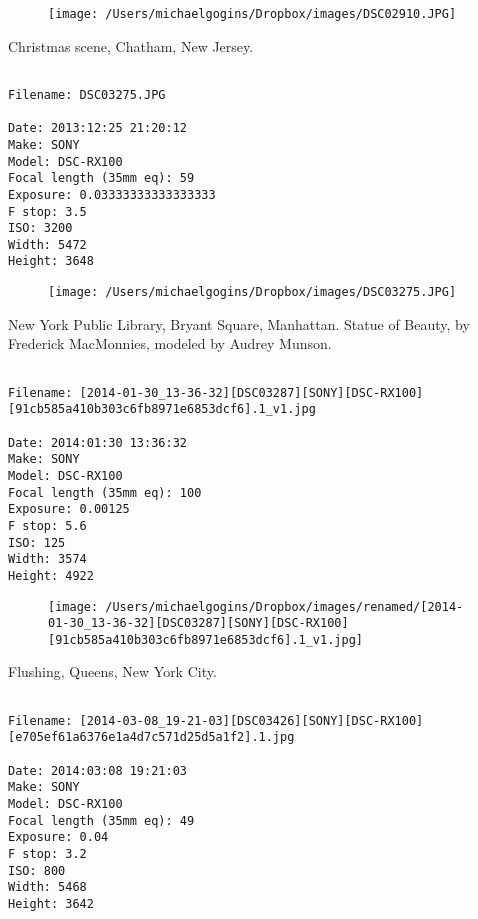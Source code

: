 \documentclass[11pt,letter,DIV=14,paper=landscape]{scrbook}
\begin{document}
\begin{figure}
\texttt{[image: /Users/michaelgogins/Dropbox/images/DSC02910.JPG]}
\end{figure}
    
\clearpage
\noindent Christmas scene, Chatham, New Jersey.
\noindent
\begin{lstlisting}

Filename: DSC03275.JPG

Date: 2013:12:25 21:20:12
Make: SONY
Model: DSC-RX100
Focal length (35mm eq): 59
Exposure: 0.03333333333333333
F stop: 3.5
ISO: 3200
Width: 5472
Height: 3648
\end{lstlisting}
\clearpage

\begin{figure}
\texttt{[image: /Users/michaelgogins/Dropbox/images/DSC03275.JPG]}
\end{figure}
    
\clearpage
\noindent New York Public Library, Bryant Square, Manhattan. Statue of Beauty, by Frederick MacMonnies, modeled by Audrey Munson.
\noindent
\begin{lstlisting}

Filename: [2014-01-30_13-36-32][DSC03287][SONY][DSC-RX100][91cb585a410b303c6fb8971e6853dcf6].1_v1.jpg

Date: 2014:01:30 13:36:32
Make: SONY
Model: DSC-RX100
Focal length (35mm eq): 100
Exposure: 0.00125
F stop: 5.6
ISO: 125
Width: 3574
Height: 4922
\end{lstlisting}
\clearpage

\begin{figure}
\texttt{[image: /Users/michaelgogins/Dropbox/images/renamed/[2014-01-30\_13-36-32][DSC03287][SONY][DSC-RX100][91cb585a410b303c6fb8971e6853dcf6].1\_v1.jpg]}
\end{figure}
    
\clearpage
\noindent Flushing, Queens, New York City.
\noindent
\begin{lstlisting}

Filename: [2014-03-08_19-21-03][DSC03426][SONY][DSC-RX100][e705ef61a6376e1a4d7c571d25d5a1f2].1.jpg

Date: 2014:03:08 19:21:03
Make: SONY
Model: DSC-RX100
Focal length (35mm eq): 49
Exposure: 0.04
F stop: 3.2
ISO: 800
Width: 5468
Height: 3642
\end{lstlisting}
\clearpage
\end{document}

